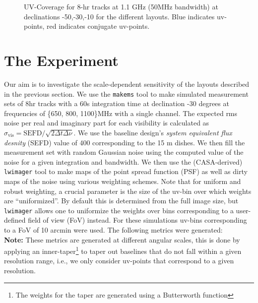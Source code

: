 \documentclass[sfheadings,a4paper,times,9pt,floats,floatfix]{article}
\begin{document}
\begin{figure}[!htb]
 \tiny{}
 \caption{UV-Coverage for 8-hr tracks at 1.1 GHz (50MHz bandwidth) at declinations -50,-30,-10 for the different layouts. Blue
indicates uv-points, red indicates conjugate uv-points.}\label{fig:uvcov}
\end{figure}
\vspace{-.5cm}     
\section{The Experiment}\label{sec:exp}
\vspace{-.1cm}
Our aim is to investigate the scale-dependent sensitivity of the layouts described in the previous section. We use the
\texttt{makems} tool to make simulated measurement sets of 8hr tracks with a 60s integration time at declination -30 degrees
at frequencies of \{650, 800, 1100\}MHz with a single channel. The expected rms noise per real and imaginary part for each
visibility is calculated as $\sigma_{\text{vis}} = \text{SEFD}/\sqrt{2\Delta t\Delta \nu}$. We use the baseline design's {\it
system equivalent flux desnity} (SEFD) value of 400 corresponding to the 15 m dishes. We then fill the measurement set with random
Gaussian noise using the computed value of the noise for a given integration and bandwidth. We then use the (CASA-derived)
\texttt{lwimager} tool to make maps of the point spread function (PSF) as well as dirty maps of the noise using various weighting
schemes. Note that for uniform and robust weighting, a crucial parameter is the size of the uv-bin over which weights are
“uniformized”. By default this is determined from the full image size, but \texttt{lwimager} allows one to uniformize the weights
over bins corresponding to a user-defined field of view (FoV) instead. For these simulations uv-bins corresponding to a FoV of 10
arcmin were used. The following metrics were generated:\\ {\bf Note:} These metrics are generated at different angular scales,
this is done by applying an inner-taper\footnote{The weights for the taper are generated using a Butterworth function } to taper
out baselines that do not fall within a given resolution range, i.e., we only consider uv-points that correspond to a given
resolution.                                                                                         
\end{document}

